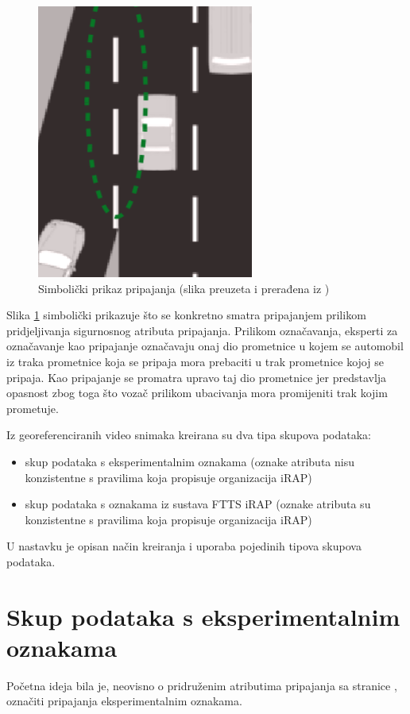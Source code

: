 \documentclass[times, utf8, diplomski, numeric]{fer}
\begin{document}
\begin{figure}[H]
\centering
\includegraphics[scale=0.75]{images/merge_lane.png}
\caption{Simbolički prikaz pripajanja (slika preuzeta i prerađena iz \citep{man:ftts_irap_coding_manual})}
\label{img:merge_lane_symbolic}
\end{figure}

\noindent Slika \ref{img:merge_lane_symbolic} simbolički prikazuje što se konkretno smatra pripajanjem prilikom pridjeljivanja sigurnosnog atributa pripajanja.
Prilikom označavanja, eksperti za označavanje kao pripajanje označavaju onaj dio prometnice u kojem se automobil iz traka prometnice koja se pripaja mora prebaciti u trak prometnice kojoj se pripaja.
Kao pripajanje se promatra upravo taj dio prometnice jer predstavlja opasnost zbog toga što vozač prilikom ubacivanja mora promijeniti trak kojim prometuje.

Iz georeferenciranih video snimaka kreirana su dva tipa skupova podataka:
\begin{itemize}
 \item skup podataka s eksperimentalnim oznakama (oznake atributa nisu konzistentne s pravilima koja propisuje organizacija iRAP)
 \item skup podataka s oznakama iz sustava FTTS iRAP (oznake atributa su konzistentne s pravilima koja propisuje organizacija iRAP)
\end{itemize}
U nastavku je opisan način kreiranja i uporaba pojedinih tipova skupova podataka.

\section{Skup podataka s eksperimentalnim oznakama}
Početna ideja bila je, neovisno o pridruženim atributima pripajanja sa stranice \citep{url:ftts_irap}, označiti pripajanja eksperimentalnim oznakama. 
\end{document}
